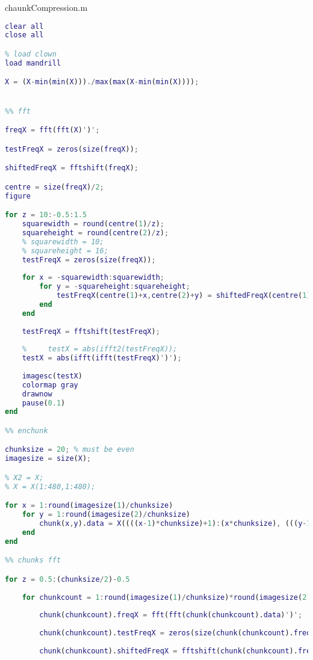 chaunkCompression.m
\begin{lstlisting}[language=Matlab, label = lst:chunk_comp, caption = {Secioned image, transform based compression code}]
clear all
close all

% load clown
load mandrill

X = (X-min(min(X)))./max(max(X-min(min(X))));


%% fft

freqX = fft(fft(X)')';

testFreqX = zeros(size(freqX));

shiftedFreqX = fftshift(freqX);

centre = size(freqX)/2;
figure

for z = 10:-0.5:1.5
    squarewidth = round(centre(1)/z);
    squareheight = round(centre(2)/z);
    % squarewidth = 10;
    % squareheight = 16;
    testFreqX = zeros(size(freqX));
    
    for x = -squarewidth:squarewidth;
        for y = -squareheight:squareheight;
            testFreqX(centre(1)+x,centre(2)+y) = shiftedFreqX(centre(1)+x,centre(2)+y);
        end
    end
    
    testFreqX = fftshift(testFreqX);
    
    %     testX = abs(ifft2(testFreqX));
    testX = abs(ifft(ifft(testFreqX)')');
    
    imagesc(testX)
    colormap gray
    drawnow
    pause(0.1)
end

%% enchunk

chunksize = 20; % must be even
imagesize = size(X);

% X2 = X;
% X = X(1:480,1:480);

for x = 1:round(imagesize(1)/chunksize)
    for y = 1:round(imagesize(2)/chunksize)
        chunk(x,y).data = X((((x-1)*chunksize)+1):(x*chunksize), (((y-1)*chunksize)+1):(y*chunksize));
    end
end

%% chunks fft

for z = 0.5:(chunksize/2)-0.5
    
    for chunkcount = 1:round(imagesize(1)/chunksize)*round(imagesize(2)/chunksize)
        
        chunk(chunkcount).freqX = fft(fft(chunk(chunkcount).data)')';
        
        chunk(chunkcount).testFreqX = zeros(size(chunk(chunkcount).freqX));
        
        chunk(chunkcount).shiftedFreqX = fftshift(chunk(chunkcount).freqX);
        

\end{lstlisting}
